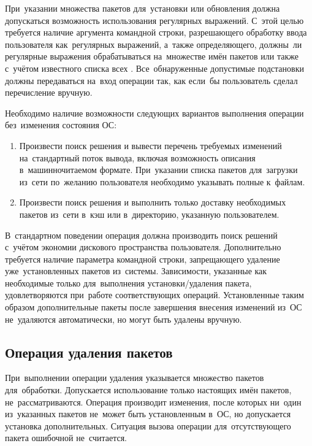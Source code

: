 При~указании множества пакетов для~установки или обновления  должна допускаться возможность использования регулярных выражений.
С~этой целью требуется наличие аргумента командной строки,  разрешающего обработку ввода пользователя как~регулярных выражений,
а~также определяющего,  должны~ли регулярные выражения обрабатываться на~множестве имён пакетов или также с~учётом известного списка всех .
Все~обнаруженные допустимые подстановки должны передаваться на~вход операции так, как если~бы пользователь сделал перечисление вручную.

Необходимо наличие возможности следующих вариантов выполнения операции без~изменения состояния ОС:

\begin{enumerate}

\item {
Произвести поиск решения и вывести перечень требуемых изменений на~стандартный поток вывода,
включая возможность описания в~машинночитаемом формате.
При~указании списка пакетов для~загрузки из~сети по~желанию пользователя необходимо указывать полные  к~файлам.
}

\item {
Произвести поиск решения и выполнить только доставку необходимых пакетов из~сети в~кэш или в~директорию, указанную пользователем.
}

\end{enumerate}

В~стандартном поведении операция должна производить поиск решений с~учётом экономии дискового пространства пользователя. 
Дополнительно требуется наличие параметра командной строки, запрещающего удаление уже~установленных пакетов из~системы. 
Зависимости, указанные как необходимые только для~выполнения установки/удаления пакета,
удовлетворяются при~работе соответствующих операций.
Установленные таким образом дополнительные пакеты после завершения внесения изменений из~ОС не~удаляются автоматически,
но могут быть удалены вручную.

\subsection{Операция удаления пакетов}

При~выполнении операции удаления указывается множество пакетов для~обработки.
Допускается использование только настоящих имён пакетов,  не~рассматриваются.
Операция производит изменения, после которых ни~один из~указанных пакетов не~может быть установленным в~ОС,
но допускается установка дополнительных.
Ситуация вызова операции для~отсутствующего пакета ошибочной не~считается.

